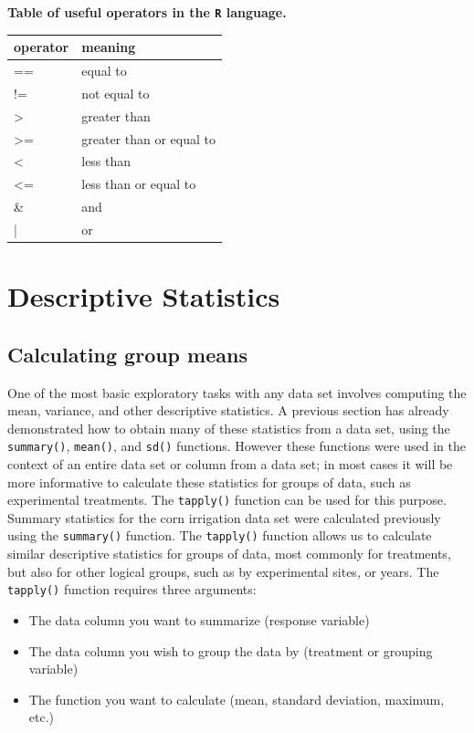 \documentclass[letterpaper,]{book}
\providecommand{\tightlist}{%
  \setlength{\itemsep}{0pt}\setlength{\parskip}{0pt}}
\begin{document}
\textbf{Table of useful operators in the \texttt{R} language.}

\begin{tabular}{l|l}
\hline
operator & meaning\\
\hline
== & equal to\\
\hline
!= & not equal to\\
\hline
> & greater than\\
\hline
>= & greater than or equal to\\
\hline
< & less than\\
\hline
<= & less than or equal to\\
\hline
\& & and\\
\hline
| & or\\
\hline
\end{tabular}

\hypertarget{descriptive-statistics}{%
\chapter{Descriptive Statistics}\label{descriptive-statistics}}

\hypertarget{calculating-group-means}{%
\section{Calculating group means}\label{calculating-group-means}}

One of the most basic exploratory tasks with any data set involves computing the mean, variance, and other descriptive statistics. A previous section has already demonstrated how to obtain many of these statistics from a data set, using the \texttt{summary()}, \texttt{mean()}, and \texttt{sd()} functions. However these functions were used in the context of an entire data set or column from a data set; in most cases it will be more informative to calculate these statistics for groups of data, such as experimental treatments. The \texttt{tapply()} function can be used for this purpose. Summary statistics for the corn irrigation data set were calculated previously using the \texttt{summary()} function. The \texttt{tapply()} function allows us to calculate similar descriptive statistics for groups of data, most commonly for treatments, but also for other logical groups, such as by experimental sites, or years. The \texttt{tapply()} function requires three arguments:

\begin{itemize}
\tightlist
\item
  The data column you want to summarize (response variable)
\item
  The data column you wish to group the data by (treatment or grouping variable)
\item
  The function you want to calculate (mean, standard deviation, maximum, etc.)
\end{itemize}
\end{document}
